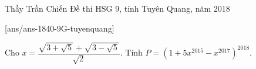 \begin{name}
{Thầy Trần Chiến}
{Đề thi HSG 9, tỉnh Tuyên Quang, năm 2018}
\end{name}

\setcounter{ex}{0}
[ans/ans-1840-9G-tuyenquang]

\begin{ex}%
	Cho $x=\dfrac{\sqrt{3+\sqrt{5}}+\sqrt{3-\sqrt{5}}}{\sqrt{2}}$. Tính $P=\left(1+5x^{2015}-x^{2017}\right)^{2018}$.
\end{ex}

